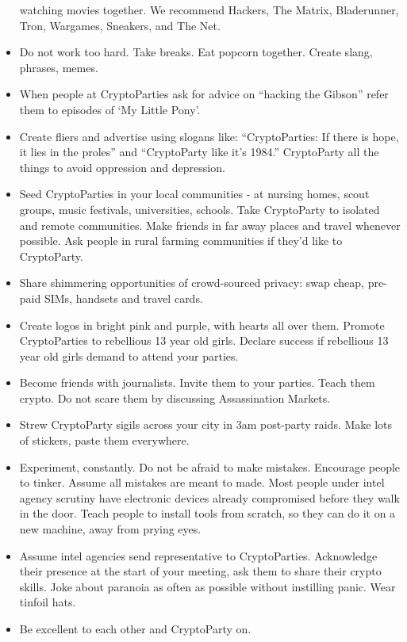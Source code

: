 \begin{itemize}
  watching movies together. We recommend Hackers, The Matrix,
  Bladerunner, Tron, Wargames, Sneakers, and The Net.
\item
  Do not work too hard. Take breaks. Eat popcorn together. Create slang,
  phrases, memes.
\item
  When people at CryptoParties ask for advice on ``hacking the Gibson''
  refer them to episodes of `My Little Pony'.
\item
  Create fliers and advertise using slogans like: ``CryptoParties: If
  there is hope, it lies in the proles'' and ``CryptoParty like it's
  1984.'' CryptoParty all the things to avoid oppression and depression.
\item
  Seed CryptoParties in your local communities - at nursing homes, scout
  groups, music festivals, universities, schools. Take CryptoParty to
  isolated and remote communities. Make friends in far away places and
  travel whenever possible. Ask people in rural farming communities if
  they'd like to CryptoParty.
\item
  Share shimmering opportunities of crowd-sourced privacy: swap cheap,
  pre-paid SIMs, handsets and travel cards.
\item
  Create logos in bright pink and purple, with hearts all over them.
  Promote CryptoParties to rebellious 13 year old girls. Declare success
  if rebellious 13 year old girls demand to attend your parties.
\item
  Become friends with journalists. Invite them to your parties. Teach
  them crypto. Do not scare them by discussing Assassination Markets.
\item
  Strew CryptoParty sigils across your city in 3am post-party raids.
  Make lots of stickers, paste them everywhere.
\item
  Experiment, constantly. Do not be afraid to make mistakes. Encourage
  people to tinker. Assume all mistakes are meant to made. Most people
  under intel agency scrutiny have electronic devices already
  compromised before they walk in the door. Teach people to install
  tools from scratch, so they can do it on a new machine, away from
  prying eyes.
\item
  Assume intel agencies send representative to CryptoParties.
  Acknowledge their presence at the start of your meeting, ask them to
  share their crypto skills. Joke about paranoia as often as possible
  without instilling panic. Wear tinfoil hats.
\item
  Be excellent to each other and CryptoParty on.
\end{itemize}
